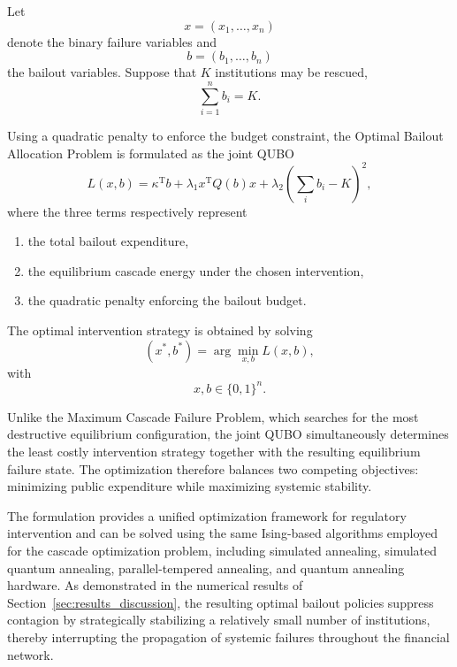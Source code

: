 \documentclass[aps,reprint,superscriptaddress,pra]{revtex4-2}
\begin{document}
Let
\begin{equation}
x=(x_1,\ldots,x_n)
\end{equation}
denote the binary failure variables and
\begin{equation}
b=(b_1,\ldots,b_n)
\end{equation}
the bailout variables. Suppose that $K$ institutions may be rescued,
\begin{equation}
\sum_{i=1}^{n}b_i = K.
\label{eq:budget_constraint}
\end{equation}

Using a quadratic penalty to enforce the budget constraint, the Optimal Bailout Allocation Problem is formulated as the joint QUBO
\begin{equation}
L(x,b)
=
\kappa^{\mathrm T}b
+
\lambda_1 x^{\mathrm T}Q(b)x
+
\lambda_2
\left(
\sum_i b_i-K
\right)^2,
\label{eq:joint_objective}
\end{equation}
where the three terms respectively represent

\begin{enumerate}
\item the total bailout expenditure,
\item the equilibrium cascade energy under the chosen intervention,
\item the quadratic penalty enforcing the bailout budget.
\end{enumerate}

The optimal intervention strategy is obtained by solving
\begin{equation}
(x^\ast,b^\ast)
=
\arg\min_{x,b}
L(x,b),
\label{eq:joint_problem}
\end{equation}
with
\[
x,b\in\{0,1\}^n.
\]

Unlike the Maximum Cascade Failure Problem, which searches for the most destructive equilibrium configuration, the joint QUBO simultaneously determines the least costly intervention strategy together with the resulting equilibrium failure state. The optimization therefore balances two competing objectives: minimizing public expenditure while maximizing systemic stability.

The formulation provides a unified optimization framework for regulatory intervention and can be solved using the same Ising-based algorithms employed for the cascade optimization problem, including simulated annealing, simulated quantum annealing, parallel-tempered annealing, and quantum annealing hardware. As demonstrated in the numerical results of Section~\ref{sec:results_discussion}, the resulting optimal bailout policies suppress contagion by strategically stabilizing a relatively small number of institutions, thereby interrupting the propagation of systemic failures throughout the financial network.
\end{document}

